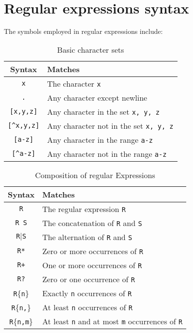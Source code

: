 \section{Regular expressions syntax}

The symbols employed in regular expressions include:
\begin{table}[H]
    \centering
    \begin{tabular}{c|l}
        \textbf{Syntax}                   & \textbf{Matches}                              \\ \hline
        \texttt{x}                        & The character \texttt{x}                      \\
        \texttt{.}                        & Any character except newline                  \\
        \texttt{[x,y,z]}                  & Any character in the set \texttt{x, y, z}     \\
        \texttt{[\textasciicircum x,y,z]} & Any character not in the set \texttt{x, y, z} \\
        \texttt{[a-z]}                    & Any character in the range \texttt{a-z}       \\
        \texttt{[\textasciicircum a-z]}   & Any character not in the range \texttt{a-z}   \\
    \end{tabular}
    \caption{Basic character sets}
\end{table}
\begin{table}[H]
    \centering
    \begin{tabular}{c|l}
        \textbf{Syntax}       & \textbf{Matches}                                                     \\ \hline
        \texttt{R}            & The regular expression \texttt{R}                                    \\
        \texttt{R S}          & The concatenation of \texttt{R} and \texttt{S}                       \\
        \texttt{R$|$S} & The alternation of \texttt{R} and \texttt{S}                         \\
        \texttt{R*}           & Zero or more occurrences of \texttt{R}                               \\
        \texttt{R+}           & One or more occurrences of \texttt{R}                                \\
        \texttt{R?}           & Zero or one occurrence of \texttt{R}                                 \\
        \texttt{R}\{\texttt{n}\}       & Exactly \texttt{n} occurrences of \texttt{R}                         \\
        \texttt{R}\{\texttt{n,}\}      & At least \texttt{n} occurrences of \texttt{R}                        \\
        \texttt{R}\{\texttt{n,m}\}     & At least \texttt{n} and at most \texttt{m} occurrences of \texttt{R} \\
    \end{tabular}
    \caption{Composition of regular Expressions}
\end{table}
